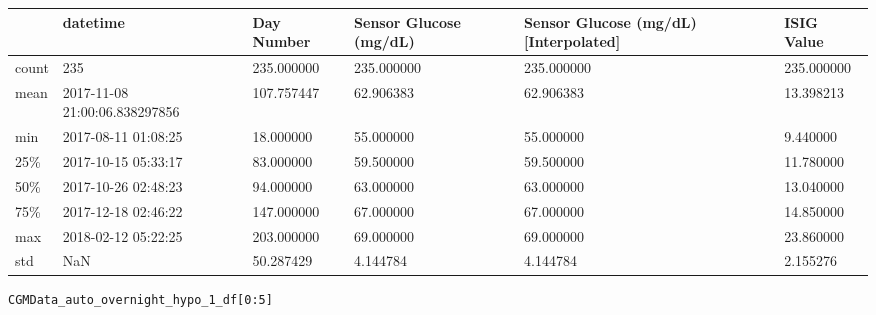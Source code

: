 \bigskip\noindent
\begin{tabular}{p{}p{}p{}p{}p{}p{}}
\toprule
 & datetime & Day Number & Sensor Glucose (mg/dL) & Sensor Glucose (mg/dL) [Interpolated] & ISIG Value \\
\hline
count & 235 & 235.000000 & 235.000000 & 235.000000 & 235.000000 \\
\hline
mean & 2017-11-08 21:00:06.838297856 & 107.757447 & 62.906383 & 62.906383 & 13.398213 \\
\hline
min & 2017-08-11 01:08:25 & 18.000000 & 55.000000 & 55.000000 & 9.440000 \\
\hline
25\% & 2017-10-15 05:33:17 & 83.000000 & 59.500000 & 59.500000 & 11.780000 \\
\hline
50\% & 2017-10-26 02:48:23 & 94.000000 & 63.000000 & 63.000000 & 13.040000 \\
\hline
75\% & 2017-12-18 02:46:22 & 147.000000 & 67.000000 & 67.000000 & 14.850000 \\
\hline
max & 2018-02-12 05:22:25 & 203.000000 & 69.000000 & 69.000000 & 23.860000 \\
\hline
std & NaN & 50.287429 & 4.144784 & 4.144784 & 2.155276 \\
\hline
\bottomrule
\end{tabular}

\bigskip

\begin{verbatim}
CGMData_auto_overnight_hypo_1_df[0:5]
\end{verbatim}

